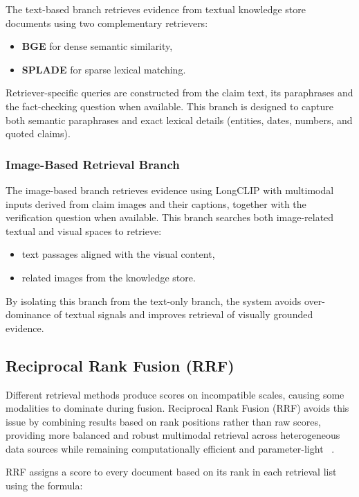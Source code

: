 The text-based branch retrieves evidence from textual knowledge store documents using two complementary retrievers:
\begin{itemize}
    \item \textbf{BGE} for dense semantic similarity,
    \item \textbf{SPLADE} for sparse lexical matching.
\end{itemize}

Retriever-specific queries are constructed from the claim text, its paraphrases and the fact-checking question when available. This branch is designed to capture both semantic paraphrases and exact lexical details (entities, dates, numbers, and quoted claims).

\subsubsection{Image-Based Retrieval Branch}

The image-based branch retrieves evidence using LongCLIP with multimodal inputs derived from claim images and their captions, together with the verification question when available. This branch searches both image-related textual and visual spaces to retrieve:
\begin{itemize}
    \item text passages aligned with the visual content,
    \item related images from the knowledge store.
\end{itemize}

By isolating this branch from the text-only branch, the system avoids over-dominance of textual signals and improves retrieval of visually grounded evidence.

\subsection{Reciprocal Rank Fusion (RRF)}

Different retrieval methods produce scores on incompatible scales, causing some modalities to dominate during fusion. Reciprocal Rank Fusion (RRF) avoids this issue by combining results based on rank positions rather than raw scores, providing more balanced and robust multimodal retrieval across heterogeneous data sources while remaining computationally efficient and parameter-light ~\cite{RyanBogan2025Nov}.

RRF assigns a score to every document based on its rank in each retrieval list using the formula:

